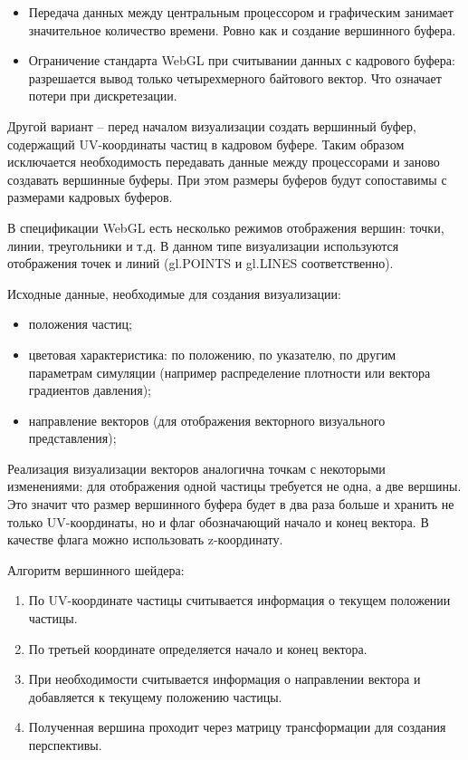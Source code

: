 \begin{itemize}
  \item Передача данных между центральным процессором и графическим занимает значительное
    количество времени. Ровно как и создание вершинного буфера.
  \item Ограничение стандарта WebGL при считывании данных с кадрового буфера: разрешается
    вывод только четырехмерного байтового вектор. Что означает потери при дискретезации.
\end{itemize}

Другой вариант -- перед началом визуализации создать вершинный буфер, содержащий UV-координаты
частиц в кадровом буфере. Таким образом исключается необходимость передавать данные
между процессорами и заново создавать вершинные буферы. При этом размеры буферов будут
сопоставимы с размерами кадровых буферов.

В спецификации WebGL есть несколько режимов отображения вершин: точки, линии, треугольники и т.д.
В данном типе визуализации используются отображения точек и линий (gl.POINTS и gl.LINES соответственно).

Исходные данные, необходимые для создания визуализации:

\begin{itemize}
  \item положения частиц;
  \item цветовая характеристика: по положению, по указателю, по другим параметрам симуляции 
    (например распределение плотности или вектора градиентов давления);
  \item направление векторов (для отображения векторного визуального представления);
\end{itemize}

Реализация визуализации векторов аналогична точкам с некоторыми изменениями: для отображения
одной частицы требуется не одна, а две вершины. Это значит что размер вершинного буфера
будет в два раза больше и хранить не только UV-координаты, но и флаг обозначающий начало
и конец вектора. В качестве флага можно использовать z-координату.

Алгоритм вершинного шейдера:

\begin{enumerate}
  \item По UV-координате частицы считывается информация о текущем положении частицы.
  \item По третьей координате определяется начало и конец вектора.
  \item При необходимости считывается информация о направлении вектора и добавляется к
    текущему положению частицы.
  \item Полученная вершина проходит через матрицу трансформации для создания перспективы.
\end{enumerate}


